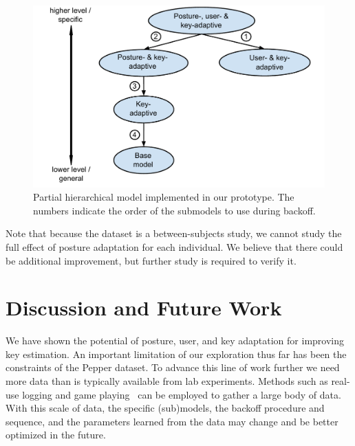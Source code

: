 \documentclass{sigchi}
\begin{document}
\begin{figure}
  \centering
  \includegraphics[width=1\columnwidth]{figures/partial-hierarchy-embed-font.pdf}
  \caption{Partial hierarchical model implemented in our prototype. The numbers indicate the order of the
submodels to use during backoff.}
  \label{fig:partial-hierarchy}
\end{figure}
Note that because the dataset is a between-subjects study, we cannot study
the full effect of posture adaptation for each individual. We believe that there could be additional improvement, but further study is required to verify it.

\pagebreak

\section{Discussion and Future Work}
We have shown the potential of posture, user, and key adaptation for 
improving key estimation. An important limitation of our exploration thus far has been
the constraints of the Pepper dataset. To advance this line of work further we
need more data than is typically available from lab experiments. Methods such as real-use logging and game 
playing~\cite{Rudchenko:2011} can be employed to gather a large body of
data. With this scale of data, the specific (sub)models, the
backoff procedure and sequence, and the parameters learned from the 
data may change and be better optimized in the future.
\end{document}
